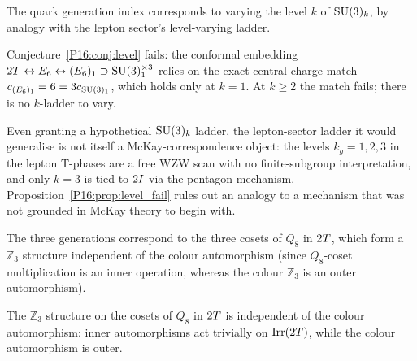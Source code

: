 \begin{conjecture}
\label{P16:conj:level}
The quark generation index corresponds to varying the level $k$ of
$\mathrm{SU}(3)_k$, by analogy with the lepton sector's level-varying ladder.
\end{conjecture}

\begin{proposition}
\label{P16:prop:level_fail}
Conjecture~\ref{P16:conj:level} fails: the conformal embedding
$2T\leftrightarrow E_6\leftrightarrow(E_6)_1\supset\mathrm{SU}(3)_1^{\times3}$
relies on the exact central-charge match $c_{(E_6)_1}=6=3c_{\mathrm{SU}(3)_1}$,
which holds only at $k=1$. At $k\geq2$ the match fails; there is no
$k$-ladder to vary.
\end{proposition}

\begin{remark}
\label{P16:rem:no_target}
Even granting a hypothetical $\mathrm{SU}(3)_k$ ladder, the lepton-sector ladder
it would generalise is not itself a McKay-correspondence object: the levels
$k_g=1,2,3$ in the lepton T-phases are a free WZW scan with no
finite-subgroup interpretation, and only $k=3$ is tied to $2I$ via the
pentagon mechanism. Proposition~\ref{P16:prop:level_fail} rules out an analogy
to a mechanism that was not grounded in McKay theory to begin with.
\end{remark}

\begin{conjecture}
\label{P16:conj:q8}
The three generations correspond to the three cosets of $Q_8$ in
$2T$, which form a $\mathbb{Z}_3$ structure independent of the colour
automorphism (since $Q_8$-coset multiplication is an inner operation,
whereas the colour $\mathbb{Z}_3$ is an outer automorphism).
\end{conjecture}

\begin{proposition}
\label{P16:prop:q8_independent}
The $\mathbb{Z}_3$ structure on the cosets of $Q_8$ in $2T$ is
independent of the colour automorphism: inner automorphisms act trivially
on $\mathrm{Irr}(2T)$, while the colour automorphism is outer.
\end{proposition}

